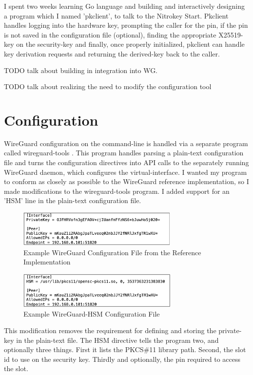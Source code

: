 \documentclass [11pt, proquest] {uwthesis}[2020/02/24]
\begin{document}
I spent two weeks learning Go language and building and interactively designing a program which I named 'pkclient', to talk to the Nitrokey Start. Pkclient handles logging into the hardware key, prompting the caller for the pin, if the pin is not saved in the configuration file (optional), finding the appropriate X25519-key on the security-key and finally, once properly initialized, pkclient can handle key derivation requests and returning the derived-key back to the caller.

TODO talk about building in integration into WG.

TODO talk about realizing the need to modify the configuration tool

\section{Configuration}
WireGuard configuration on the command-line is handled via a separate program called wireguard-tools \cite{noauthor_wireguard-tools_2022}. This program handles parsing a plain-text configuration file and turns the configuration directives into API calls to the separately running WireGuard daemon, which configures the virtual-interface. I wanted my program to conform as closely as possible to the WireGuard reference implementation, so I made modifications to the wireguard-tools program. I added support for an 'HSM' line in the plain-text configuration file. 
\begin{figure}[ht]
\includegraphics[width=8cm]{paper/images/wg_conf_std.png}
\caption{Example WireGuard Configuration File from the Reference Implementation}
\label{fig:wg_config}
\end{figure}

\begin{figure}[ht]
\includegraphics[width=8cm]{paper/images/wg_conf_hsm.png}
\caption{Example WireGuard-HSM Configuration File}
\label{fig:hsm_config}
\end{figure}
This modification removes the requirement for defining and storing the private-key in the plain-text file. The HSM directive tells the program two, and optionally three things. First it lists the PKCS\#11 library path. Second, the slot id  to use on the security key. Thirdly and optionally, the pin required to access the slot.
\end{document}
